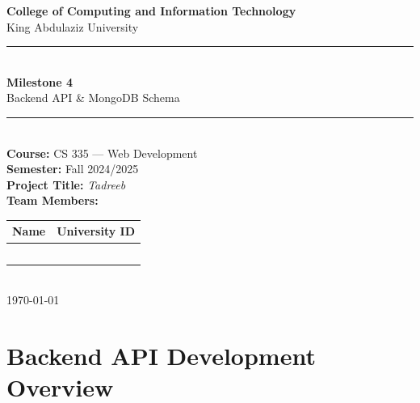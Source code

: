 \documentclass[12pt,a4paper]{article}
\begin{document}
\begin{titlepage}
  \centering
  \vspace*{2cm}

  {\large\textbf{College of Computing and Information Technology}}\\[0.4cm]
  {\large King Abdulaziz University}\\[1cm]

  \rule{\linewidth}{1.5pt}\\[0.6cm]
  {\huge\bfseries\color{tadreebblue} Milestone 4}\\[0.4cm]
  {\Large Backend API \& MongoDB Schema}\\[0.2cm]
  \rule{\linewidth}{1.5pt}\\[1cm]

  {\large\textbf{Course:} CS 335 — Web Development}\\[0.2cm]
  {\large\textbf{Semester:} Fall 2024/2025}\\[0.2cm]
  {\large\textbf{Project Title:} \textit{Tadreeb}}\\[1.5cm]

  {\large\textbf{Team Members:}}\\[0.5cm]
  \begin{tabular}{ll}
    \toprule
    \textbf{Name} & \textbf{University ID} \\
    \midrule
    \quad & \quad \\[0.3cm]
    \quad & \quad \\[0.3cm]
    \quad & \quad \\[0.3cm]
    \quad & \quad \\[0.3cm]
    \quad & \quad \\
    \bottomrule
  \end{tabular}\\[2cm]

  {\large\today}

\end{titlepage}

\tableofcontents
\newpage

\section{Backend API Development Overview}
\end{document}
